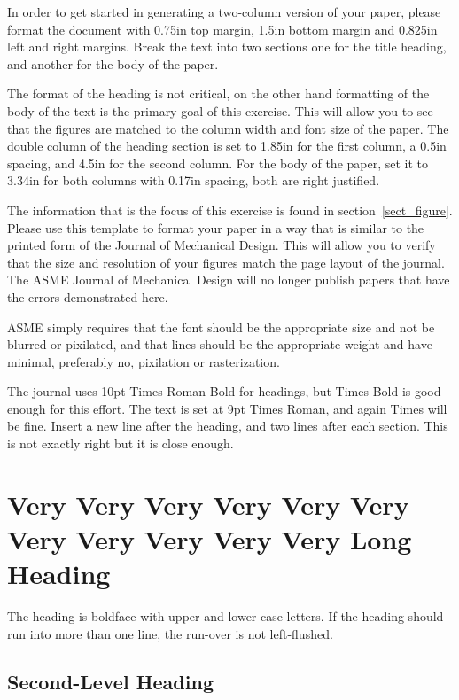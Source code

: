 \documentclass[twocolumn,10pt]{asme2ej}
\begin{document}
In order to get started in generating a two-column version of your paper, please format the document with 0.75in top margin, 1.5in bottom margin and 0.825in left and right margins.  Break the text into two sections one for the title heading, and another for the body of the paper.  

The format of the heading is not critical, on the other hand formatting of the body of the text is the primary goal of this exercise.  This will allow you to see that the figures are matched to the column width and font size of the paper.  The double column of the heading section is set to 1.85in for the first column, a 0.5in spacing, and 4.5in for the second column.  For the body of the paper, set it to 3.34in for both columns with 0.17in spacing, both are right justified. 

The information that is the focus of this exercise is found in 
section~\ref{sect_figure}.
Please use this template to format your paper in a way that is similar to the printed form of the Journal of Mechanical Design.  This will allow you to verify that the size and resolution of your figures match the page layout of the journal.  The ASME Journal of Mechanical Design will no longer publish papers that have the errors demonstrated here.

ASME simply requires that the font should be the appropriate size and not be blurred or pixilated, and that lines should be the appropriate weight and have minimal, preferably no, pixilation or rasterization.

The journal uses 10pt Times Roman Bold for headings, but Times Bold is good enough for this effort.  The text is set at 9pt Times Roman, and again Times will be fine.  Insert a new line after the heading, and two lines after each section.  This is not exactly right but it is close enough.


\section{Very Very Very Very Very Very Very Very Very Very Very Long Heading}

The heading is boldface with upper and lower case letters. 
If the heading should run into more than one line, the run-over is not left-flushed.

\subsection{Second-Level Heading}
\end{document}
